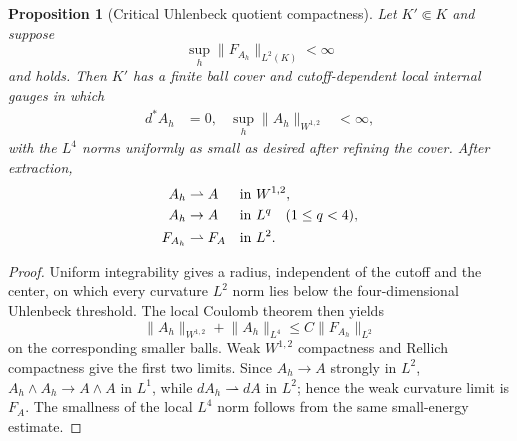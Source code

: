 \documentclass[11pt]{article}
\numberwithin{equation}{section}
\newtheorem{proposition}[proposition]{Proposition}
\theoremstyle{definition}
\theoremstyle{remark}
\newcommand{\norm}[1]{\lVert#1\rVert}
\begin{document}
\begin{proposition}[Critical Uhlenbeck quotient compactness]
\label{prop:critical-uhlenbeck}
Let $K'\Subset K$ and suppose
\begin{equation}
 \sup_h\norm{F_{A_h}}_{L^2(K)}<\infty
 \label{eq:critical-curvature-bound}
\end{equation}
and  holds.  Then $K'$ has a finite ball cover
and cutoff-dependent local internal gauges in which
\begin{align}
 d^*A_h&=0,
 &\sup_h\norm{A_h}_{W^{1,2}}&<\infty,
 \label{eq:critical-coulomb-bound}
\end{align}
with the $L^4$ norms uniformly as small as desired after refining the cover.
After extraction,
\begin{align}
 A_h&\rightharpoonup A &&\text{in }W^{1,2},\notag\\
 A_h&\to A &&\text{in }L^q\quad(1\le q<4),\notag\\
 F_{A_h}&\rightharpoonup F_A &&\text{in }L^2.
 \label{eq:critical-coulomb-convergence}
\end{align}
\end{proposition}
\begin{proof}
Uniform integrability gives a radius, independent of the cutoff and the
center, on which every curvature $L^2$ norm lies below the four-dimensional
Uhlenbeck threshold.  The local Coulomb theorem then yields
\[
 \norm{A_h}_{W^{1,2}}+\norm{A_h}_{L^4}
 \le C\norm{F_{A_h}}_{L^2}
\]
on the corresponding smaller balls.  Weak $W^{1,2}$ compactness and Rellich
compactness give the first two limits.  Since $A_h\to A$ strongly in $L^2$,
$A_h\wedge A_h\to A\wedge A$ in $L^1$, while $dA_h\rightharpoonup dA$ in
$L^2$; hence the weak curvature limit is $F_A$.  The smallness of the local
$L^4$ norm follows from the same small-energy estimate.
\end{proof}
\end{document}
